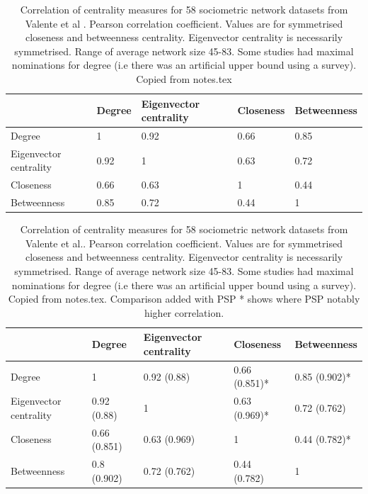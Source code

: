 \begin{table}[]
    \centering
    \begin{tabular}{lllll}
    \toprule
          & Degree & Eigenvector centrality & Closeness & Betweenness \\
         \midrule
    Degree  & 1  & 0.92  & 0.66 & 0.85\\
    Eigenvector centrality & 0.92 & 1 & 0.63 & 0.72  \\
    Closeness & 0.66 & 0.63 & 1 & 0.44  \\
    Betweenness& 0.85 & 0.72 & 0.44 & 1 \\
    \bottomrule
    \end{tabular}
    \caption[Correlation of centrality measures for sociometric networks]{Correlation of centrality measures for 58 sociometric network datasets from Valente et al \cite{valente2008correlated}. Pearson correlation coefficient. Values are for symmetrised closeness and betweenness centrality. Eigenvector centrality is necessarily symmetrised. Range of average network size 45-83. Some studies had maximal nominations for degree (i.e there was an artificial upper bound using a survey). Copied from notes.tex}
    \label{tab:Correlation of centrality valente et al}
\end{table}

\begin{table}[]
    \centering
    \begin{tabular}{lllll}
    \toprule
          & Degree & Eigenvector centrality & Closeness & Betweenness \\
         \midrule
    Degree  & 1  & 0.92 (0.88)  & 0.66 (0.851)*  & 0.85 (0.902)*\\
    Eigenvector centrality & 0.92 (0.88)  & 1 & 0.63 (0.969)* & 0.72 (0.762)  \\
    Closeness & 0.66 (0.851)  & 0.63 (0.969) & 1 & 0.44 (0.782)* \\
    Betweenness& 0.8 (0.902) & 0.72 (0.762) & 0.44 (0.782) & 1 \\
    \bottomrule
    \end{tabular}
    \caption[Correlation of sociometric centrality measures compared with correlation of measures in PSP]{Correlation of centrality measures for 58 sociometric network datasets from Valente et al.\cite{valente2008correlated}. Pearson correlation coefficient. Values are for symmetrised closeness and betweenness centrality. Eigenvector centrality is necessarily symmetrised. Range of average network size 45-83. Some studies had maximal nominations for degree (i.e there was an artificial upper bound using a survey). Copied from notes.tex. Comparison added with PSP * shows where PSP notably higher correlation.}
    \label{tab:Correlation of centrality valente et al compared with PSP}
\end{table}

